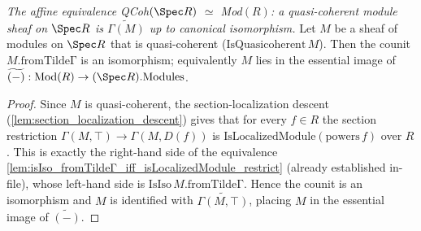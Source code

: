 \begin{lemma}
  \label{lem:qcoh_affine_isIso_fromTildeΓ}
  \textit{The affine equivalence QCoh\((\Spec R)\) \(\simeq\) Mod\((R)\): a quasi-coherent module
  sheaf on \(\Spec R\) is \(\widetilde{\Gamma(M)}\) up to canonical isomorphism.}
  Let \(M\) be a sheaf of modules on \(\Spec R\) that is quasi-coherent
  (\(\mathrm{IsQuasicoherent}\,M\)). Then the counit \(M.\mathrm{fromTildeΓ}\) is an isomorphism;
  equivalently \(M\) lies in the essential image of \(\widetilde{(-)} : \mathrm{Mod}(R) \to (\Spec
  R).\mathrm{Modules}\).
\end{lemma}
\begin{proof}
  Since \(M\) is quasi-coherent, the section-localization descent
  (\cref{lem:section_localization_descent}) gives that for every \(f \in R\) the section restriction
  \(\Gamma(M, \top) \to \Gamma(M, D(f))\) is \(\mathrm{IsLocalizedModule}(\mathrm{powers}\,f)\) over
  \(R\). This is exactly the right-hand side of the equivalence
  \cref{lem:isIso_fromTildeΓ_iff_isLocalizedModule_restrict} (already established in-file), whose
  left-hand side is \(\mathrm{IsIso}\,M.\mathrm{fromTildeΓ}\). Hence the counit is an isomorphism and
  \(M\) is identified with \(\widetilde{\Gamma(M, \top)}\), placing \(M\) in the essential image of
  \(\widetilde{(-)}\).
\end{proof}

